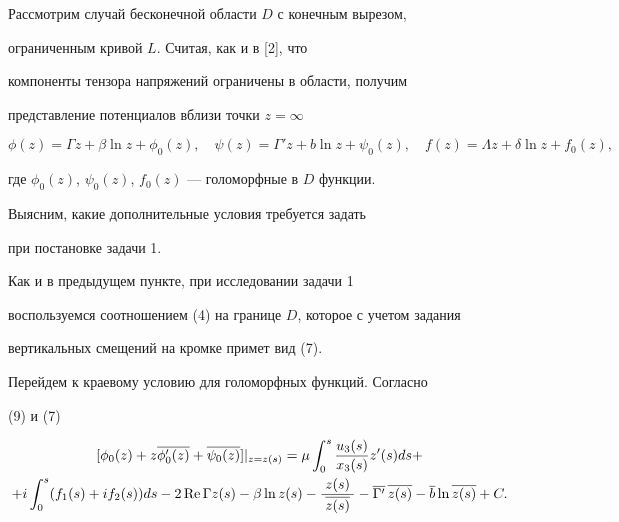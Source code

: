 Рассмотрим случай бесконечной области $D$ с конечным вырезом,


ограниченным кривой $L$. Считая, как и в [2], что


компоненты тензора напряжений ограничены в области, получим


представление потенциалов вблизи точки $z = \infty$


\begin{equation}


\phi(z) = \Gamma z + \beta \ln z + \phi_0(z) ,\quad \psi(z) = \Gamma'


z + b \ln z + \psi_0(z),\quad f(z) = \Lambda z + \delta \ln z +


f_0(z),


\end{equation}


где $\phi_0(z)$, $\psi_0(z)$, $f_0(z)$ --- голоморфные в $D$ функции.





Выясним, какие дополнительные условия требуется задать


при постановке задачи 1.





Как и в предыдущем пункте, при исследовании задачи 1


воспользуемся соотношением (4) на границе $D$, которое с учетом задания 


вертикальных смещений на кромке примет вид (7).


Перейдем к краевому условию для голоморфных функций. Согласно


(9) и (7)


\begin{gather}


[\phi_0(z) + z\overline{\phi_0'(z)} +


\overline{\psi_0(z)}]\vert_{z = z(s)} = \mu \int_0^s


\frac{u_3(s)}{x_3(s)}z'(s) ds +\notag \\


%


+ i\int_0^s (f_1(s) + i f_2(s)) ds - 2 \re \Gamma z(s) - \beta \ln


z(s) - \frac{\;z(s)\;}{\overline{z(s)}} - \overline{\Gamma'}\,


\overline{z(s)} - \overline{b} \ln \overline{z(s)} + C.


\end{gather}


